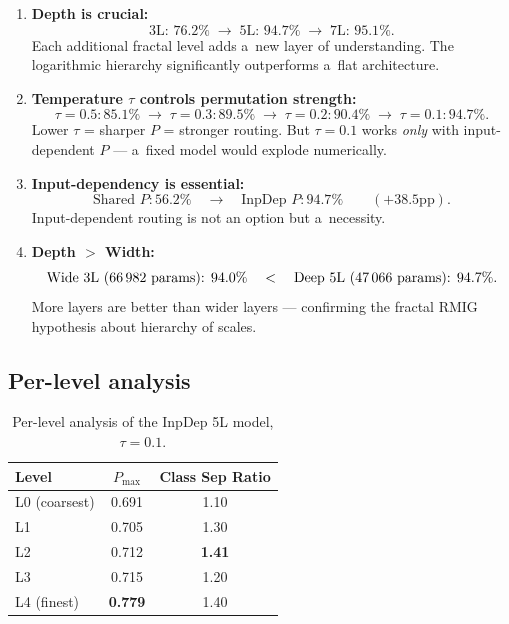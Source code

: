 \documentclass[11pt,a4paper]{report}
\begin{document}
\begin{enumerate}
    \item \textbf{Depth is crucial:}
    \begin{equation*}
    \text{3L: } 76.2\% \;\to\; \text{5L: } 94.7\% \;\to\; \text{7L: } 95.1\%.
    \end{equation*}
    Each additional fractal level adds a~new layer of understanding. The logarithmic hierarchy significantly outperforms a~flat architecture.
    
    \item \textbf{Temperature $\tau$ controls permutation strength:}
    \begin{equation*}
    \tau=0.5: 85.1\% \;\to\; \tau=0.3: 89.5\% \;\to\; \tau=0.2: 90.4\% \;\to\; \tau=0.1: 94.7\%.
    \end{equation*}
    Lower $\tau$ = sharper $P$ = stronger routing. But $\tau=0.1$ works \emph{only} with input-dependent $P$ --- a~fixed model would explode numerically.
    
    \item \textbf{Input-dependency is essential:}
    \begin{equation*}
    \text{Shared } P: 56.2\% \quad\longrightarrow\quad \text{InpDep } P: 94.7\% \qquad (+38.5\text{pp}).
    \end{equation*}
    Input-dependent routing is not an option but a~necessity.
    
    \item \textbf{Depth $>$ Width:}
    \begin{equation*}
    \text{Wide 3L (66\,982 params): } 94.0\% \quad<\quad \text{Deep 5L (47\,066 params): } 94.7\%.
    \end{equation*}
    More layers are better than wider layers --- confirming the fractal RMIG hypothesis about hierarchy of scales.
\end{enumerate}


\subsection{Per-level analysis}

\begin{table}[h]
\centering
\caption{Per-level analysis of the InpDep 5L model, $\tau=0.1$.}
\begin{tabular}{lcc}
\hline
\textbf{Level} & $P_{\max}$ & \textbf{Class Sep Ratio} \\
\hline
L0 (coarsest) & 0.691 & 1.10 \\
L1               & 0.705 & 1.30 \\
L2               & 0.712 & \textbf{1.41} \\
L3               & 0.715 & 1.20 \\
L4 (finest) & \textbf{0.779} & 1.40 \\
\hline
\end{tabular}
\end{table}
\end{document}
